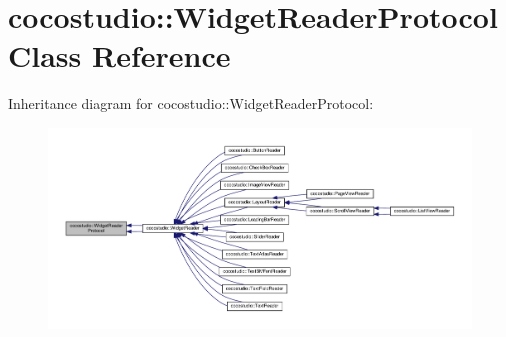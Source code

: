 \hypertarget{classcocostudio_1_1WidgetReaderProtocol}{}\section{cocostudio\+:\+:Widget\+Reader\+Protocol Class Reference}
\label{classcocostudio_1_1WidgetReaderProtocol}


Inheritance diagram for cocostudio\+:\+:Widget\+Reader\+Protocol\+:
\nopagebreak
\begin{figure}[H]
\begin{center}
\leavevmode
\includegraphics[width=350pt]{classcocostudio_1_1WidgetReaderProtocol__inherit__graph}
\end{center}
\end{figure}
